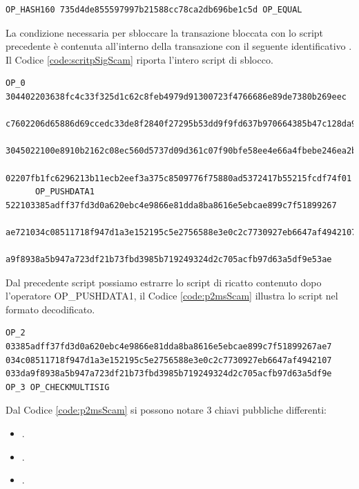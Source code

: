 \begin{example}
\begin{lstlisting}[language=bitcoinscript, label={code:scriptPubKeyScam}, caption={Script da cui è originato l'address preso in esempio.}]
      OP_HASH160 735d4de855597997b21588cc78ca2db696be1c5d OP_EQUAL
   \end{lstlisting}
   La condizione necessaria per sbloccare la transazione bloccata con lo script precedente è contenuta all'interno della transazione con il seguente identificativo . Il Codice \ref{code:scritpSigScam} riporta l'intero script di sblocco.
     \begin{lstlisting}[language=bitcoinscript, label={code:scritpSigScam}, caption={Script con cui è possibile eseguire con successo lo script illustrato attraverso il Codice \ref{code:scriptPubKeyScam}.}]
      OP_0 304402203638fc4c33f325d1c62c8feb4979d91300723f4766686e89de7380b269eec
        c7602206d65886d69ccedc33de8f2840f27295b53dd9f9fd637b970664385b47c128da901
        3045022100e8910b2162c08ec560d5737d09d361c07f90bfe58ee4e66a4fbebe246ea2b32c
        02207fb1fc6296213b11ecb2eef3a375c8509776f75880ad5372417b55215fcdf74f01
      OP_PUSHDATA1 522103385adff37fd3d0a620ebc4e9866e81dda8ba8616e5ebcae899c7f51899267
        ae721034c08511718f947d1a3e152195c5e2756588e3e0c2c7730927eb6647af494210721033d
        a9f8938a5b947a723df21b73fbd3985b719249324d2c705acfb97d63a5df9e53ae
     \end{lstlisting}
     Dal precedente script possiamo estrarre lo script di ricatto contenuto dopo l'operatore OP\_PUSHDATA1, il Codice \ref{code:p2msScam} illustra lo script nel formato decodificato.
     \begin{lstlisting}[language=bitcoinscript, label={code:p2msScam}, caption={Readme Script contenuto all'interno dello script di sblocco \ref{code:scritpSigScam}.}]
      OP_2 03385adff37fd3d0a620ebc4e9866e81dda8ba8616e5ebcae899c7f51899267ae7 034c08511718f947d1a3e152195c5e2756588e3e0c2c7730927eb6647af4942107 033da9f8938a5b947a723df21b73fbd3985b719249324d2c705acfb97d63a5df9e OP_3 OP_CHECKMULTISIG
    \end{lstlisting}
    Dal Codice \ref{code:p2msScam} si possono notare 3 chiavi pubbliche differenti:
    \begin{itemize}
      \item {}.
      \item {}.
      \item {}.

\end{itemize}
\end{example}

